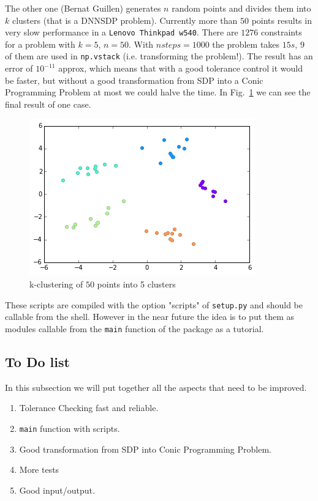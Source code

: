 \documentclass[paper=a4, fontsize=11pt]{scrartcl}
\numberwithin{equation}{section}		%
\numberwithin{figure}{section}			%
\numberwithin{table}{section}				%
\begin{document}
The other one (Bernat Guillen) generates $n$ random points and divides them into $k$ clusters (that is a DNNSDP problem). Currently more than $50$ points results in very slow performance in a \texttt{Lenovo Thinkpad w540}. There are $1276$ constraints for a problem with $k=5$, $n=50$. With $nsteps = 1000$ the problem takes $15 s$, $9$ of them are used in \texttt{np.vstack} (i.e. transforming the problem!). The result has an error of $10^{-11}$ approx, which means that with a good tolerance control it would be faster, but without a good transformation from SDP into a Conic Programming Problem at most we could halve the time. In Fig.~\ref{fig:kclust} we can see the final result of one case.
\begin{figure}[h]
\label{fig:kclust}
\centering
\includegraphics[scale=0.7]{images/kclustering.png} 
\caption{k-clustering of $50$ points into 5 clusters}

\end{figure}

These scripts are compiled with the option "scripts" of \texttt{setup.py} and should be callable from the shell. However in the near future the idea is to put them as modules callable from the \texttt{main} function of the package as a tutorial. 

\subsection{To Do list}
In this subsection we will put together all the aspects that need to be improved.
\begin{enumerate}
\item Tolerance Checking fast and reliable.
\item \texttt{main} function with scripts.
\item Good transformation from SDP into Conic Programming Problem.
\item More tests
\item Good input/output.
\end{enumerate}
\end{document}
